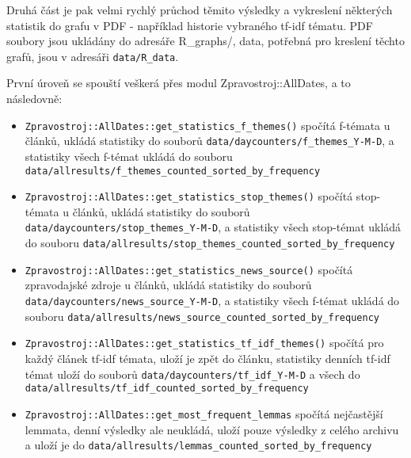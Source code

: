 \documentclass[12pt,a4paper]{report}
\begin{document}
Druhá část je pak velmi rychlý průchod těmito výsledky a vykreslení některých statistik do grafu v PDF - například historie vybraného tf-idf tématu. PDF soubory jsou ukládány do adresáře R\_graphs/, data, potřebná pro kreslení těchto grafů, jsou v adresáři \texttt{data/R\_data}.

První úroveň se spouští veškerá přes modul Zpravostroj::AllDates, a to následovně:

\begin{itemize}
	\item \texttt{Zpravostroj::AllDates::get\_statistics\_f\_themes()} spočítá f-témata u článků, ukládá statistiky do souborů \texttt{data/daycounters/f\_themes\_Y-M-D}, a statistiky všech f-témat ukládá do souboru \texttt{data/allresults/f\_themes\_counted\_sorted\_by\_frequency}
	\item \texttt{Zpravostroj::AllDates::get\_statistics\_stop\_themes()} spočítá stop-témata u článků, ukládá statistiky do souborů \texttt{data/daycounters/stop\_themes\_Y-M-D}, a statistiky všech stop-témat ukládá do souboru \texttt{data/allresults/stop\_themes\_counted\_sorted\_by\_frequency}
	\item \texttt{Zpravostroj::AllDates::get\_statistics\_news\_source()} spočítá zpravodajské zdroje u článků, ukládá statistiky do souborů \texttt{data/daycounters/news\_source\_Y-M-D}, a statistiky všech f-témat ukládá do souboru \texttt{data/allresults/news\_source\_counted\_sorted\_by\_frequency}
	\item \texttt{Zpravostroj::AllDates::get\_statistics\_tf\_idf\_themes()} spočítá pro každý článek tf-idf témata, uloží je zpět do článku, statistiky denních tf-idf témat uloží do souborů \texttt{data/daycounters/tf\_idf\_Y-M-D} a všech do \texttt{data/allresults/tf\_idf\_counted\_sorted\_by\_frequency}
	\item \texttt{Zpravostroj::AllDates::get\_most\_frequent\_lemmas} spočítá nejčastější lemmata, denní výsledky ale neukládá, uloží pouze výsledky z celého archivu a uloží je do \texttt{data/allresults/lemmas\_counted\_sorted\_by\_frequency}
\end{itemize}
\end{document}
